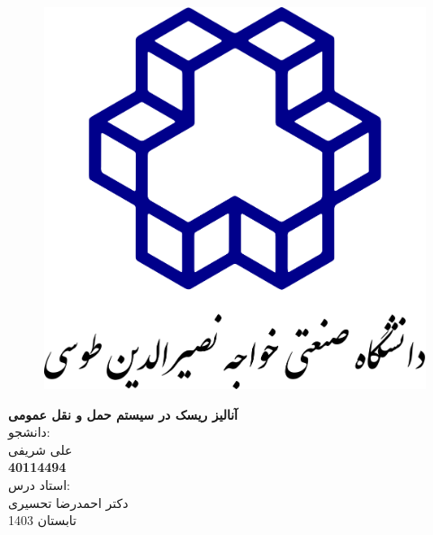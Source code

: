 \begin{titlepage}
    \begin{center}
    \begin{figure}
        \centering
        \includegraphics[width=0.5\linewidth]{KNTU.png}
    \end{figure}

    {\fontsize{24}{32}\selectfont \bfseries آنالیز ریسک در سیستم حمل و نقل عمومی} 
    \\\vspace{20pt}
    دانشجو:\\
    {\LARGE علی شریفی} \\
    \vspace{10pt}
    \textbf{40114494}\\
    \vspace{20pt}
    استاد درس:\\
    {\LARGE دکتر احمدرضا تحسیری} \\
    \vfill
    تابستان 1403
    \end{center}

\end{titlepage}